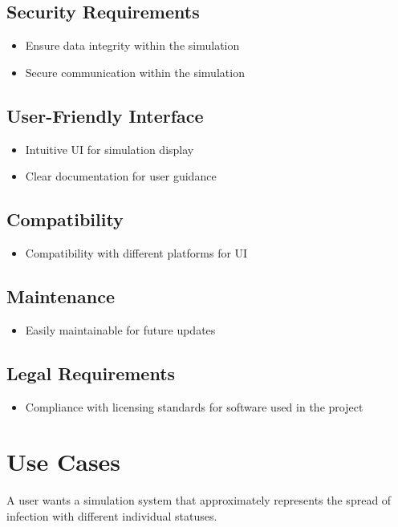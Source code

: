 \documentclass{article}
\begin{document}
	\subsection{Security Requirements}
	\begin{itemize}
		\item Ensure data integrity within the simulation
		\item Secure communication within the simulation
	\end{itemize}
	
	\subsection{User-Friendly Interface}
	\begin{itemize}
		\item Intuitive UI for simulation display
		\item Clear documentation for user guidance
	\end{itemize}
	
	\subsection{Compatibility}
	\begin{itemize}
		\item Compatibility with different platforms for UI
	\end{itemize}
	
	\subsection{Maintenance}
	\begin{itemize}
		\item Easily maintainable for future updates
	\end{itemize}
	
	\subsection{Legal Requirements}
	\begin{itemize}
		\item Compliance with licensing standards for software used in the project
	\end{itemize}
	
	\section{Use Cases}
	A user wants a simulation system that approximately represents the spread of infection with different individual statuses.
	
\end{document}
